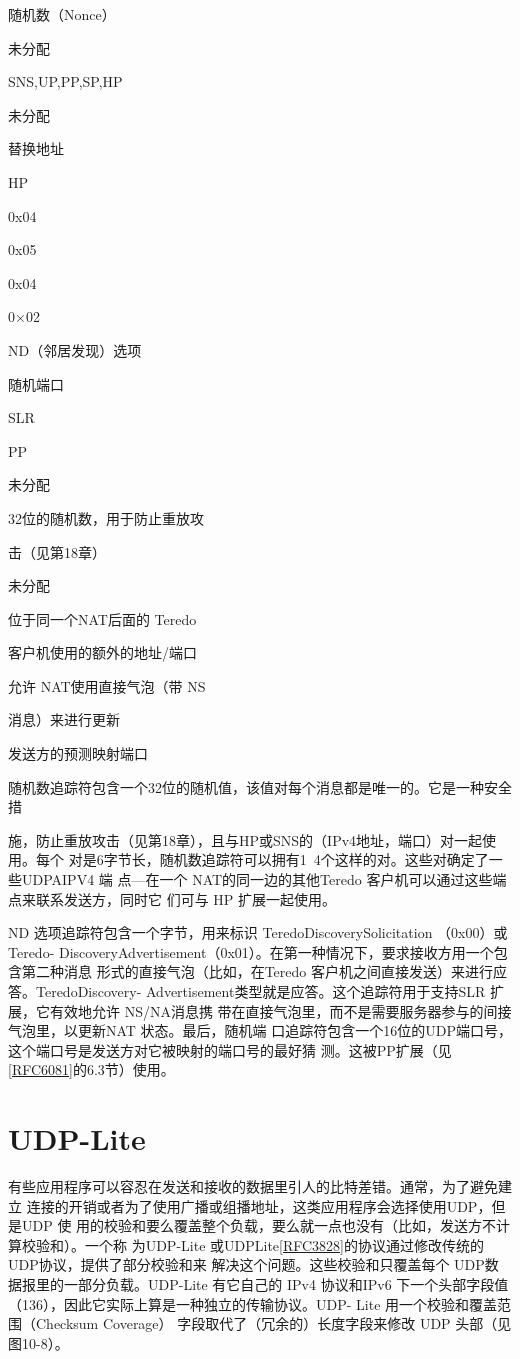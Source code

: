 随机数（Nonce）

未分配

SNS,UP,PP,SP,HP

未分配

替换地址

HP

0x04

0x05

0x04

0×02

ND（邻居发现）选项

随机端口

SLR

PP

未分配

32位的随机数，用于防止重放攻

击（见第18章）

未分配

位于同一个NAT后面的 Teredo

客户机使用的额外的地址/端口

允许 NAT使用直接气泡（带 NS

消息）来进行更新

发送方的预测映射端口

随机数追踪符包含一个32位的随机值，该值对每个消息都是唯一的。它是一种安全措

施，防止重放攻击（见第18章），且与HP或SNS的（IPv4地址，端口）对一起使用。每个
对是6字节长，随机数追踪符可以拥有1~4个这样的对。这些对确定了一些UDPAIPV4 端
点—在一个 NAT的同一边的其他Teredo 客户机可以通过这些端点来联系发送方，同时它
们可与 HP 扩展一起使用。


ND 选项追踪符包含一个字节，用来标识 TeredoDiscoverySolicitation （0x00）或 Teredo-
DiscoveryAdvertisement（0x01）。在第一种情况下，要求接收方用一个包含第二种消息
形式的直接气泡（比如，在Teredo 客户机之间直接发送）来进行应答。TeredoDiscovery-
Advertisement类型就是应答。这个追踪符用于支持SLR 扩展，它有效地允许 NS/NA消息携
带在直接气泡里，而不是需要服务器参与的间接气泡里，以更新NAT 状态。最后，随机端
口追踪符包含一个16位的UDP端口号，这个端口号是发送方对它被映射的端口号的最好猜
测。这被PP扩展（见\href{https://www.rfc-editor.org/rfc/rfc6081}{[RFC6081]}的6.3节）使用。

\section{UDP-Lite}
有些应用程序可以容忍在发送和接收的数据里引人的比特差错。通常，为了避免建立
连接的开销或者为了使用广播或组播地址，这类应用程序会选择使用UDP，但是UDP 使
用的校验和要么覆盖整个负载，要么就一点也没有（比如，发送方不计算校验和）。一个称
为UDP-Lite 或UDPLite\href{https://www.rfc-editor.org/rfc/rfc3828}{[RFC3828]}的协议通过修改传统的UDP协议，提供了部分校验和来
解决这个问题。这些校验和只覆盖每个 UDP数据报里的一部分负载。UDP-Lite 有它自己的
IPv4 协议和IPv6 下一个头部字段值（136），因此它实际上算是一种独立的传输协议。UDP-
Lite 用一个校验和覆盖范围（Checksum Coverage） 字段取代了（冗余的）长度字段来修改
UDP 头部（见图10-8）。

